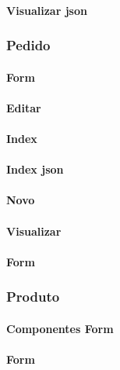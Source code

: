 \paragraph{Visualizar json}


\subsubsection{Pedido}
\paragraph{Form}

\paragraph{Editar}

\paragraph{Index}

\paragraph{Index json}

\paragraph{Novo}

\paragraph{Visualizar}

\paragraph{Form}


\subsubsection{Produto}
\paragraph{Componentes Form}

\paragraph{Form}

